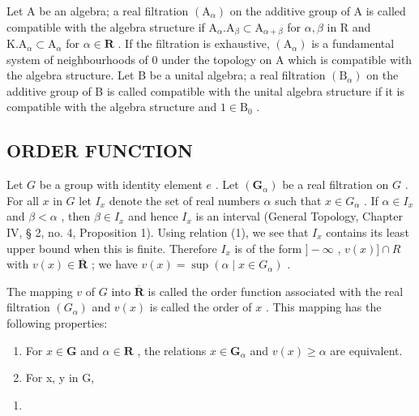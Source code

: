Let A be an algebra; a real filtration \((\mathrm{A}_{\alpha})\) on the additive group of A is called compatible with the algebra structure if \(\mathrm{A}_{\alpha}.\mathrm{A}_{\beta}\subset \mathrm{A}_{\alpha +\beta}\) for \(\alpha ,\beta\) in R and \(\mathrm{K.A}_{\alpha}\subset \mathrm{A}_{\alpha}\) for \(\alpha \in \mathbf{R}\) . If the filtration is exhaustive, \((\mathrm{A}_{\alpha})\) is a fundamental system of neighbourhoods of 0 under the topology on A which is compatible with the algebra structure. Let B be a unital algebra; a real filtration \((\mathrm{B}_{\alpha})\) on the additive group of B is called compatible with the unital algebra structure if it is compatible with the algebra structure and \(1\in \mathrm{B}_0\) .

\subsection{ORDER FUNCTION}

Let \(G\) be a group with identity element \(e\) . Let \((\mathbf{G}_{\alpha})\) be a real filtration on \(G\) . For all \(x\) in \(G\) let \(I_x\) denote the set of real numbers \(\alpha\) such that \(x \in G_{\alpha}\) . If \(\alpha \in I_x\) and \(\beta < \alpha\) , then \(\beta \in I_x\) and hence \(I_x\) is an interval (General Topology, Chapter IV, § 2, no. 4, Proposition 1). Using relation (1), we see that \(I_x\) contains its least upper bound when this is finite. Therefore \(I_x\) is of the form \(] - \infty\) , \(v(x)] \cap R\) with \(v(x) \in \overline{\mathbf{R}}\) ; we have \(v(x) = \sup(\alpha \mid x \in G_{\alpha})\) .

The mapping \(v\) of \(G\) into \(\overline{\mathbf{R}}\) is called the order function associated with the real filtration \((G_{\alpha})\) and \(v(x)\) is called the order of \(x\) . This mapping has the following properties:

\begin{enumerate}
\def\labelenumi{(\alph{enumi})}
\item
  For \(x \in \mathbf{G}\) and \(\alpha \in \mathbf{R}\) , the relations \(x \in \mathbf{G}_{\alpha}\) and \(v(x) \geqslant \alpha\) are equivalent.
\item
  For x, y in G,
\end{enumerate}

\begin{enumerate}
\def\labelenumi{(\arabic{enumi})}
\setcounter{enumi}{1}
\tightlist
\item
\end{enumerate}

